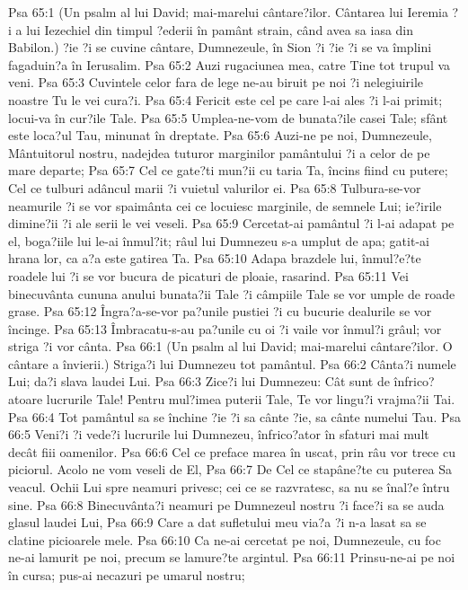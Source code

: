 Psa 65:1  (Un psalm al lui David; mai-marelui cântare?ilor. Cântarea lui Ieremia ?i a lui Iezechiel din timpul ?ederii în pamânt strain, când avea sa iasa din Babilon.) ?ie ?i se cuvine cântare, Dumnezeule, în Sion ?i ?ie ?i se va împlini fagaduin?a în Ierusalim.
Psa 65:2  Auzi rugaciunea mea, catre Tine tot trupul va veni.
Psa 65:3  Cuvintele celor fara de lege ne-au biruit pe noi ?i nelegiuirile noastre Tu le vei cura?i.
Psa 65:4  Fericit este cel pe care l-ai ales ?i l-ai primit; locui-va în cur?ile Tale.
Psa 65:5  Umplea-ne-vom de bunata?ile casei Tale; sfânt este loca?ul Tau, minunat în dreptate.
Psa 65:6  Auzi-ne pe noi, Dumnezeule, Mântuitorul nostru, nadejdea tuturor marginilor pamântului ?i a celor de pe mare departe;
Psa 65:7  Cel ce gate?ti mun?ii cu taria Ta, încins fiind cu putere; Cel ce tulburi adâncul marii ?i vuietul valurilor ei.
Psa 65:8  Tulbura-se-vor neamurile ?i se vor spaimânta cei ce locuiesc marginile, de semnele Lui; ie?irile dimine?ii ?i ale serii le vei veseli.
Psa 65:9  Cercetat-ai pamântul ?i l-ai adapat pe el, boga?iile lui le-ai înmul?it; râul lui Dumnezeu s-a umplut de apa; gatit-ai hrana lor, ca a?a este gatirea Ta.
Psa 65:10  Adapa brazdele lui, înmul?e?te roadele lui ?i se vor bucura de picaturi de ploaie, rasarind.
Psa 65:11  Vei binecuvânta cununa anului bunata?ii Tale ?i câmpiile Tale se vor umple de roade grase.
Psa 65:12  Îngra?a-se-vor pa?unile pustiei ?i cu bucurie dealurile se vor încinge.
Psa 65:13  Îmbracatu-s-au pa?unile cu oi ?i vaile vor înmul?i grâul; vor striga ?i vor cânta.
Psa 66:1  (Un psalm al lui David; mai-marelui cântare?ilor. O cântare a învierii.) Striga?i lui Dumnezeu tot pamântul.
Psa 66:2  Cânta?i numele Lui; da?i slava laudei Lui.
Psa 66:3  Zice?i lui Dumnezeu: Cât sunt de înfrico?atoare lucrurile Tale! Pentru mul?imea puterii Tale, Te vor lingu?i vrajma?ii Tai.
Psa 66:4  Tot pamântul sa se închine ?ie ?i sa cânte ?ie, sa cânte numelui Tau.
Psa 66:5  Veni?i ?i vede?i lucrurile lui Dumnezeu, înfrico?ator în sfaturi mai mult decât fiii oamenilor.
Psa 66:6  Cel ce preface marea în uscat, prin râu vor trece cu piciorul. Acolo ne vom veseli de El,
Psa 66:7  De Cel ce stapâne?te cu puterea Sa veacul. Ochii Lui spre neamuri privesc; cei ce se razvratesc, sa nu se înal?e întru sine.
Psa 66:8  Binecuvânta?i neamuri pe Dumnezeul nostru ?i face?i sa se auda glasul laudei Lui,
Psa 66:9  Care a dat sufletului meu via?a ?i n-a lasat sa se clatine picioarele mele.
Psa 66:10  Ca ne-ai cercetat pe noi, Dumnezeule, cu foc ne-ai lamurit pe noi, precum se lamure?te argintul.
Psa 66:11  Prinsu-ne-ai pe noi în cursa; pus-ai necazuri pe umarul nostru;
